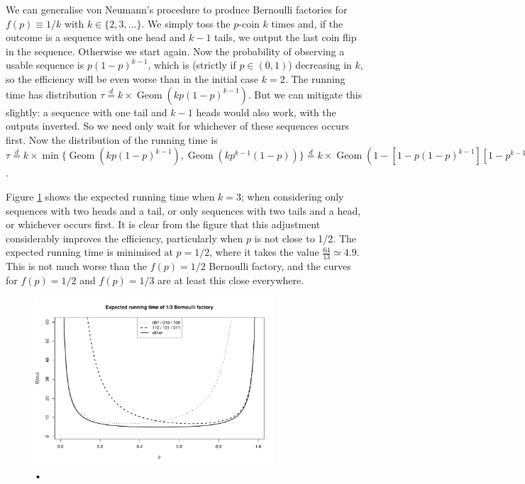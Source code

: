 \documentclass{article}
\theoremstyle{definition}
\newcommand{\eqdist}{\overset{d}{=}}
\newcommand{\Geom}{\operatorname{Geom}}
\begin{document}
We can generalise von Neumann's procedure to produce Bernoulli factories for $f(p)\equiv 1/k$ with $k\in\{2,3,\dots\}$. We simply toss the $p$-coin $k$ times and, if the outcome is a sequence with one head and $k-1$ tails, we output the last coin flip in the sequence. Otherwise we start again.
Now the probability of observing a usable sequence is $p(1-p)^{k-1}$, which is (strictly if $p\in(0,1)$) decreasing in $k$, so the efficiency will be even worse than in the initial case $k=2$. The running time has distribution $\tau \eqdist k \times \Geom(kp(1-p)^{k-1})$.
But we can mitigate this slightly: a sequence with one tail and $k-1$ heads would also work, with the outputs inverted. So we need only wait for whichever of these sequences occurs first. Now the distribution of the running time is $\tau \eqdist k \times \min\{\Geom(kp(1-p)^{k-1}), \Geom(kp^{k-1}(1-p))\} \eqdist k \times \Geom(1- [1-p(1-p)^{k-1}][1-p^{k-1}(1-p)])$.

Figure \ref{fig:runtime_const3} shows the expected running time when $k=3$; when considering only sequences with two heads and a tail, or only sequences with two tails and a head, or whichever occurs first.
It is clear from the figure that this adjustment considerably improves the efficiency, particularly when $p$ is not close to 1/2. The expected running time is minimised at $p=1/2$, where it takes the value $\frac{64}{13} \simeq 4.9$. This is not much worse than the $f(p)=1/2$ Bernoulli factory, and the curves for $f(p)=1/2$ and $f(p)=1/3$ are at least this close everywhere.\\

\begin{figure}
\centering
\includegraphics[width=0.8\textwidth]{const3_runtime.pdf}
\caption{•}
\label{fig:runtime_const3}
\end{figure}
\end{document}
